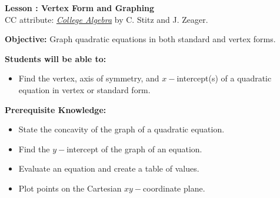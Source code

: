 \documentclass[12pt]{article}
\theoremstyle{definition}
\begin{document}
{\bf \large Lesson : Vertex Form and Graphing}
\\ CC attribute: \href{http://www.stitz-zeager.com}{\it{College Algebra}} by C. Stitz and J. Zeager. 
\hfill \doclicenseImage[imagewidth=5em]\\
\par
{\bf Objective:} Graph quadratic equations in both standard and vertex forms.\\
\par
{\bf Students will be able to:}
\begin{itemize}
	\item Find the vertex, axis of symmetry, and $x-$intercept(s) of a quadratic equation in vertex or standard form.
\end{itemize}
{\bf Prerequisite Knowledge:}
\begin{itemize}
	\item State the concavity of the graph of a quadratic equation.
	\item Find the $y-$intercept of the graph of an equation.
	\item Evaluate an equation and create a table of values.
	\item Plot points on the Cartesian $xy-$coordinate plane.
\end{itemize}
\hrulefill
\end{document}
